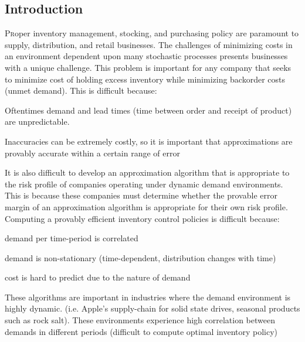 \documentclass[twoside]{article}
\begin{document}
\begin{multicols}{2} %

\section{Introduction}

\lettrine[nindent=0em,lines=2]{P}roper inventory management, stocking, and purchasing policy are paramount to supply, distribution, and retail businesses. The challenges of minimizing costs in an environment dependent upon many stochastic processes presents businesses with a unique challenge. This problem is important for any company that seeks to minimize cost of holding excess inventory while minimizing backorder costs (unmet demand). This is difficult because:
  \begin{compactitem}
    \item Oftentimes demand and lead times (time between order and receipt of product) are unpredictable.
    \item Inaccuracies can be extremely costly, so it is important that approximations are provably accurate within a certain range of error
  \end{compactitem}
It is also difficult to develop an approximation algorithm that is appropriate to the risk profile of companies operating under dynamic demand environments. This is because these companies must determine whether the provable error margin of an approximation algorithm is appropriate for their own risk profile. Computing a provably efficient inventory control policies is difficult because:
  \begin{compactitem}
    \item demand per time-period is correlated
    \item demand is non-stationary (time-dependent, distribution changes with time)
    \item cost is hard to predict due to the nature of demand
  \end{compactitem}
These algorithms are important in industries where the demand environment is highly dynamic. (i.e. Apple's supply-chain for solid state drives, seasonal products such as rock salt). These environments experience high correlation between demands in different periods (difficult to compute optimal inventory policy)



\end{multicols}
\end{document}
